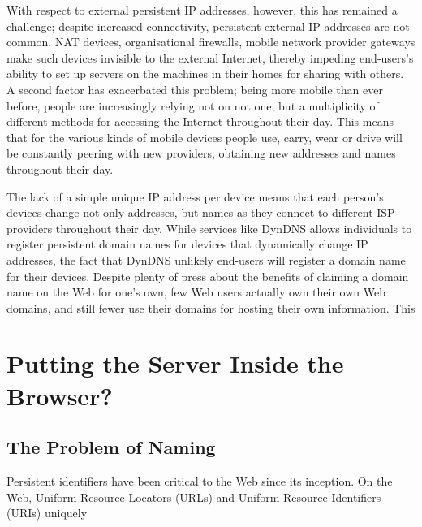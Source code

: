 \documentclass{amsart}
\begin{document}
With respect to external persistent IP addresses, however, this has remained a challenge; despite increased connectivity, persistent external IP addresses are not common.  NAT devices, organisational firewalls, mobile network provider gateways make such devices invisible to the external Internet, thereby impeding end-users's ability to set up servers on the machines in their homes for sharing with others.  A second factor has exacerbated this problem; being more mobile than ever before, people are increasingly relying not on not one, but a multiplicity of different methods for accessing the Internet throughout their day.  This means that for the various kinds of mobile devices people use, carry, wear or drive will be constantly peering with new providers, obtaining new addresses and names throughout their day.

The lack of a simple unique IP address per device means that each person's devices change not only addresses, but names as they connect to different ISP providers throughout their day.  While services like DynDNS allows individuals to register persistent domain names for devices that dynamically change IP addresses, the fact that DynDNS unlikely end-users will register a domain name for their devices.  Despite plenty of press about the benefits of claiming a domain name on the Web for one's own, few Web users actually own their own Web domains, and still fewer use their domains for hosting their own information.  This 

\section{Putting the Server Inside the Browser?}


\subsection{The Problem of Naming}

Persistent identifiers have been critical to the Web since its inception.  On the Web, Uniform Resource Locators (URLs) and Uniform Resource Identifiers (URIs) uniquely 



\end{document}
